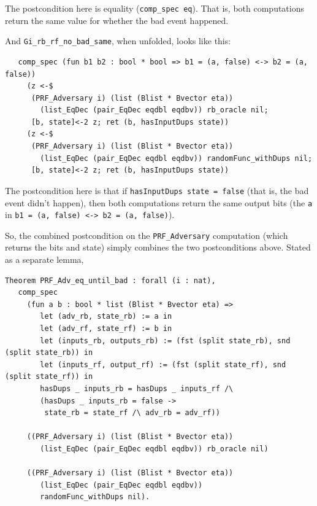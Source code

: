 \documentclass[12pt,lot, lof]{puthesis}
\newcommand{\li} {\lstinline}
\begin{document}
{The postcondition here is equality (\li|comp_spec eq|). That is, both computations return the same value for whether the bad event happened.

And \li|Gi_rb_rf_no_bad_same|, when unfolded, looks like this:

\begin{lstlisting}
   comp_spec (fun b1 b2 : bool * bool => b1 = (a, false) <-> b2 = (a, false))
     (z <-$
      (PRF_Adversary i) (list (Blist * Bvector eta))
        (list_EqDec (pair_EqDec eqdbl eqdbv)) rb_oracle nil;
      [b, state]<-2 z; ret (b, hasInputDups state))
     (z <-$
      (PRF_Adversary i) (list (Blist * Bvector eta))
        (list_EqDec (pair_EqDec eqdbl eqdbv)) randomFunc_withDups nil;
      [b, state]<-2 z; ret (b, hasInputDups state))
\end{lstlisting}      

The postcondition here is that if \li|hasInputDups state = false| (that is, the bad event didn't happen), then both computations return the same output bits (the \li|a| in \li|b1 = (a, false) <-> b2 = (a, false)|).

So, the combined postcondition on the \li|PRF_Adversary| computation (which returns the bits and state) simply combines the two postconditions above. Stated as a separate lemma,

\begin{lstlisting}
Theorem PRF_Adv_eq_until_bad : forall (i : nat),
   comp_spec 
     (fun a b : bool * list (Blist * Bvector eta) =>
        let (adv_rb, state_rb) := a in
        let (adv_rf, state_rf) := b in
        let (inputs_rb, outputs_rb) := (fst (split state_rb), snd (split state_rb)) in
        let (inputs_rf, output_rf) := (fst (split state_rf), snd (split state_rf)) in
        hasDups _ inputs_rb = hasDups _ inputs_rf /\
        (hasDups _ inputs_rb = false ->
         state_rb = state_rf /\ adv_rb = adv_rf))
         
     ((PRF_Adversary i) (list (Blist * Bvector eta))
        (list_EqDec (pair_EqDec eqdbl eqdbv)) rb_oracle nil)
        
     ((PRF_Adversary i) (list (Blist * Bvector eta))
        (list_EqDec (pair_EqDec eqdbl eqdbv))
        randomFunc_withDups nil).
\end{lstlisting}

}
\end{document}

